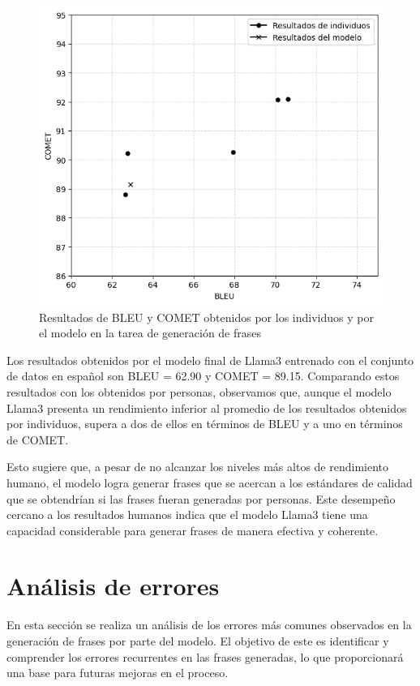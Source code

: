 \documentclass[11pt,spanish,listoffigures,listoftables]{tfgetsinf}
\begin{document}
\begin{figure}[h]
\includegraphics[scale = 0.8]{images/comparacion_individuos.png}
\centering
\caption{Resultados de BLEU y COMET obtenidos por los individuos y por el modelo en la tarea de generación de frases}
\label{fig:comparacionIndividuos}
\end{figure}

Los resultados obtenidos por el modelo final de Llama3 entrenado con el conjunto de datos en español son BLEU = 62.90 y COMET = 89.15. Comparando estos resultados con los obtenidos por personas, observamos que, aunque el modelo Llama3 presenta un rendimiento inferior al promedio de los resultados obtenidos por individuos, supera a dos de ellos en términos de BLEU y a uno en términos de COMET.

Esto sugiere que, a pesar de no alcanzar los niveles más altos de rendimiento humano, el modelo logra generar frases que se acercan a los estándares de calidad que se obtendrían si las frases fueran generadas por personas. Este desempeño cercano a los resultados humanos indica que el modelo Llama3 tiene una capacidad considerable para generar frases de manera efectiva y coherente.

\section{Análisis de errores}

En esta sección se realiza un análisis de los errores más comunes observados en la generación de frases por parte del modelo. El objetivo de este es identificar y comprender los errores recurrentes en las frases generadas, lo que proporcionará una base para futuras mejoras en el proceso.
\end{document}
